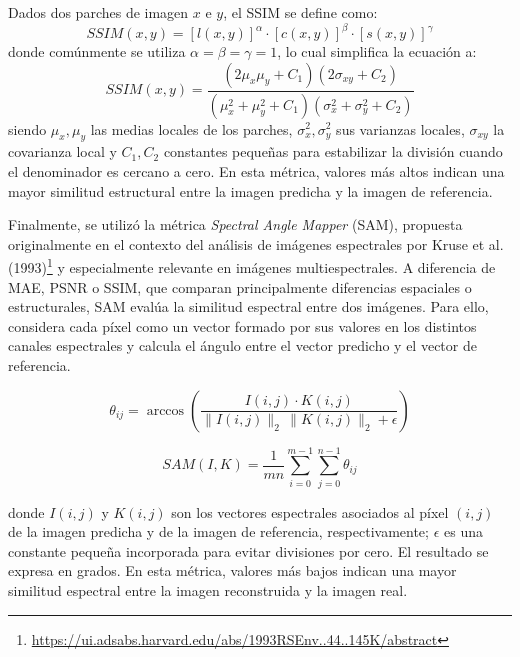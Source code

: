 Dados dos parches de imagen $x$ e $y$, el SSIM se define como:
\begin{equation}
    SSIM(x,y)=[l(x,y)]^\alpha \cdot [c(x,y)]^\beta \cdot [s(x,y)]^\gamma
\end{equation}
donde comúnmente se utiliza $\alpha=\beta=\gamma=1$, lo cual simplifica la ecuación a:
\begin{equation}
    SSIM(x,y)=\frac{(2\mu_x\mu_y + C_1)(2\sigma_{xy} + C_2)}{(\mu_x^2 + \mu_y^2 + C_1)(\sigma_x^2 + \sigma_y^2 + C_2)}
    \label{SSIM}
\end{equation}
siendo $\mu_x,\mu_y$ las medias locales de los parches, $\sigma_x^2, \sigma_y^2$ sus varianzas locales, $\sigma_{xy}$ la covarianza local y $C_1, C_2$ constantes pequeñas para estabilizar la división cuando el denominador es cercano a cero. En esta métrica, valores más altos indican una mayor similitud estructural entre la imagen predicha y la imagen de referencia.

Finalmente, se utilizó la métrica \textit{Spectral Angle Mapper} (SAM), propuesta originalmente en el contexto del análisis de imágenes espectrales por Kruse et al. (1993)\footnote{\url{https://ui.adsabs.harvard.edu/abs/1993RSEnv..44..145K/abstract}} y especialmente relevante en imágenes multiespectrales. A diferencia de MAE, PSNR o SSIM, que comparan principalmente diferencias espaciales o estructurales, SAM evalúa la similitud espectral entre dos imágenes. Para ello, considera cada píxel como un vector formado por sus valores en los distintos canales espectrales y calcula el ángulo entre el vector predicho y el vector de referencia.

\begin{equation}
\theta_{ij} =
\operatorname{arccos}\left(
\frac{I(i,j)\cdot K(i,j)}
{\|I(i,j)\|_2 \, \|K(i,j)\|_2 + \epsilon}
\right)
\label{SAM_theta}
\end{equation}

\begin{equation}
SAM(I,K)=\frac{1}{mn}\sum_{i=0}^{m-1}\sum_{j=0}^{n-1}\theta_{ij}
\label{SAM}
\end{equation}

donde $I(i,j)$ y $K(i,j)$ son los vectores espectrales asociados al píxel $(i,j)$ de la imagen predicha y de la imagen de referencia, respectivamente; $\epsilon$ es una constante pequeña incorporada para evitar divisiones por cero. El resultado se expresa en grados. En esta métrica, valores más bajos indican una mayor similitud espectral entre la imagen reconstruida y la imagen real.


